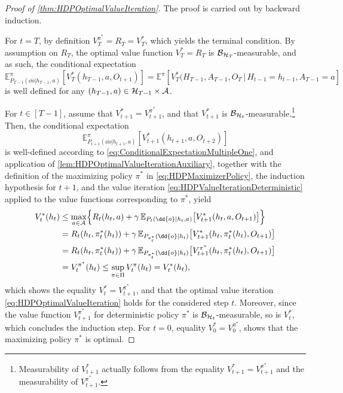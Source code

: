 \documentclass[
    a4paper,
    11pt,
    bibliography=totoc,
    listof=totoc,      
    headinclude=true,
    cleardoublepage=empty,
]{scrbook}
\theoremstyle{plain}
\theoremstyle{definition}
\theoremstyle{remark}
\newcommand{\E}{\mathbb E}
\newcommand{\SpaceA}{{\cal A}}
\newcommand{\SpaceH}{{\cal H}}
\begin{document}
\begin{proof}[Proof of \cref{thm:HDPOptimalValueIteration}]
    The proof is carried out by backward induction. 
    
    For $t=T$, by definition 
    $V^{\pi^*}_T = R_T = V^*_T$, which yields the terminal condition. By 
    assumption on $R_T$, the optimal value function $V^*_T = R_T$ is 
    $\mathcal{B}_{\SpaceH_T}$-measurable, and as such, the conditional 
    expectation
    \[
        \E^\pi_{P_{T-1}(\dd{o}|h_{T-1},a)}[
            V^*_T(h_{T-1}, a, O_{t+1})
        ]
        = \E^\pi[V^*_T(H_{T-1},A_{T-1},O_T\,|\, H_{t-1}=h_{t-1}, A_{T-1}=a]
    \]
    is well defined for any $(h_{T-1},a)\in\SpaceH_{T-1}\times\SpaceA$. 

    For $t\in[T-1]$, assume that $V^*_{t+1} = V^{\pi^*}_{t+1}$, and that 
    $V^*_{t+1}$ is $\mathcal{B}_{\SpaceH_t}$-measurable.\footnote{
    Measurability of $V^*_{t+1}$ actually follows from the equality $V^*_{t+1}=V^{\pi^*}_{t+1}$ and the measurability of $V^{\pi^*}_{t+1}$.
    }
    Then, the conditional expectation 
    \[
        \E^\pi_{P_{t+1}(\dd{o}|h_{t+1},a)}[V^*_{t+1}(h_{t+1}, a, O_{t+2})]
    \]
    is well-defined according to \cref{eq:ConditionalExpectationMultipleOne}, 
    and application of \cref{lem:HDPOptimalValueIterationAuxiliary}, together 
    with the definition of the maximizing policy $\pi^*$ in 
    \cref{eq:HDPMaximizerPolicy}, the induction hypothesis for $t+1$, and the 
    value iteration \eqref{eq:HDPValueIterationDeterministic} applied to the 
    value functions corresponding to $\pi^*$, yield
    \begin{align*}
        V^*_t(h_t) 
        & \leq \max_{a\in\SpaceA} \Bigl\{ R_t(h_t,a) + \gamma\,
            \E_{P_t(\dd{o}|h_t,a)}\bigl[ V^*_{t+1}(h_t,a,O_{t+1}) \bigr]
        \Bigr\} \\
        & = R_t(h_t,\pi^*_t(h_t)) + \gamma\,
            \E_{P_{\pi^*_t}(\dd{o}|h_t)}\bigl[ 
                V^*_{t+1}(h_t,\pi^*_t(h_t),O_{t+1})
            \bigr]\\
        & = R_t(h_t,\pi^*_t(h_t)) + \gamma\,
            \E_{P_{\pi^*_t}(\dd{o}|h_t)}\bigl[
                V^{\pi^*}_{t+1}(h_t,\pi^*_t(h_t),O_{t+1})
            \bigr] \\
        & = V^{\pi^*}_t(h_t)
        \leq \sup_{\pi\in\Pi} V^{\pi}_t(h_t) = V^*_t(h_t),
    \end{align*}
    which shows the equality $V^*_t=V^{\pi^*}_{t+1}$, and that the optimal 
    value iteration \eqref{eq:HDPOptimalValueIteration} holds for the 
    considered step $t$. Moreover, since the value function $V^{\pi^*}_{t+1}$ 
    for deterministic policy $\pi^*$ is $\mathcal{B}_{\SpaceH_t}$-measurable, 
    so is $V^*_t$, which concludes the induction step. For $t=0$, equality $V^*_0=V_0^{\pi^*}$, shows that the maximizing policy $\pi^*$ is optimal.
\end{proof}
\end{document}
